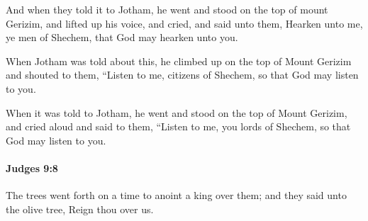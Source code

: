 			\begin{versebox}
					\item[BHS] 
					\item[ASV] And when they told it to Jotham, he went and stood on the top of mount Gerizim, and lifted up his voice, and cried, and said unto them, Hearken unto me, ye men of Shechem, that God may hearken unto you.
					\item[NIV] When Jotham was told about this, he climbed up on the top of Mount Gerizim and shouted to them, “Listen to me, citizens of Shechem, so that God may listen to you.
					\item[NRSV] When it was told to Jotham, he went and stood on the top of Mount Gerizim, and cried aloud and said to them, “Listen to me, you lords of Shechem, so that God may listen to you.
			\end{versebox}

		\paragraph{Judges 9:8} %
			\label{JUDGES-9-8}

			The trees went forth on a time to anoint a king over them; and they said unto the olive tree, Reign thou over us.

